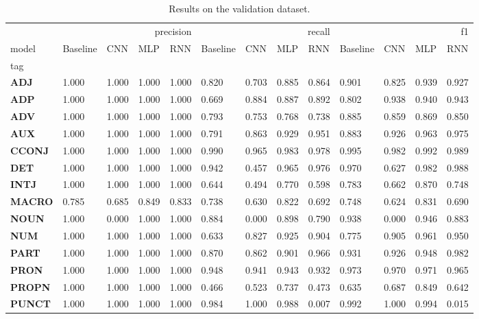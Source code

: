 \begin{table}
\caption{Results on the validation dataset.}
\label{tab::ex_2_valid}
\begin{tabular}{|l||l||l||l||l||l||l||l||l||l||l||l||l|}
\toprule
 & \multicolumn{4}{r}{precision} & \multicolumn{4}{r}{recall} & \multicolumn{4}{r}{f1} \\
model & Baseline & CNN & MLP & RNN & Baseline & CNN & MLP & RNN & Baseline & CNN & MLP & RNN \\
tag &  &  &  &  &  &  &  &  &  &  &  &  \\
\midrule
\textbf{ADJ} & 1.000 & 1.000 & 1.000 & 1.000 & 0.820 & 0.703 & 0.885 & 0.864 & 0.901 & 0.825 & 0.939 & 0.927 \\
\textbf{ADP} & 1.000 & 1.000 & 1.000 & 1.000 & 0.669 & 0.884 & 0.887 & 0.892 & 0.802 & 0.938 & 0.940 & 0.943 \\
\textbf{ADV} & 1.000 & 1.000 & 1.000 & 1.000 & 0.793 & 0.753 & 0.768 & 0.738 & 0.885 & 0.859 & 0.869 & 0.850 \\
\textbf{AUX} & 1.000 & 1.000 & 1.000 & 1.000 & 0.791 & 0.863 & 0.929 & 0.951 & 0.883 & 0.926 & 0.963 & 0.975 \\
\textbf{CCONJ} & 1.000 & 1.000 & 1.000 & 1.000 & 0.990 & 0.965 & 0.983 & 0.978 & 0.995 & 0.982 & 0.992 & 0.989 \\
\textbf{DET} & 1.000 & 1.000 & 1.000 & 1.000 & 0.942 & 0.457 & 0.965 & 0.976 & 0.970 & 0.627 & 0.982 & 0.988 \\
\textbf{INTJ} & 1.000 & 1.000 & 1.000 & 1.000 & 0.644 & 0.494 & 0.770 & 0.598 & 0.783 & 0.662 & 0.870 & 0.748 \\
\textbf{MACRO} & 0.785 & 0.685 & 0.849 & 0.833 & 0.738 & 0.630 & 0.822 & 0.692 & 0.748 & 0.624 & 0.831 & 0.690 \\
\textbf{NOUN} & 1.000 & 0.000 & 1.000 & 1.000 & 0.884 & 0.000 & 0.898 & 0.790 & 0.938 & 0.000 & 0.946 & 0.883 \\
\textbf{NUM} & 1.000 & 1.000 & 1.000 & 1.000 & 0.633 & 0.827 & 0.925 & 0.904 & 0.775 & 0.905 & 0.961 & 0.950 \\
\textbf{PART} & 1.000 & 1.000 & 1.000 & 1.000 & 0.870 & 0.862 & 0.901 & 0.966 & 0.931 & 0.926 & 0.948 & 0.982 \\
\textbf{PRON} & 1.000 & 1.000 & 1.000 & 1.000 & 0.948 & 0.941 & 0.943 & 0.932 & 0.973 & 0.970 & 0.971 & 0.965 \\
\textbf{PROPN} & 1.000 & 1.000 & 1.000 & 1.000 & 0.466 & 0.523 & 0.737 & 0.473 & 0.635 & 0.687 & 0.849 & 0.642 \\
\textbf{PUNCT} & 1.000 & 1.000 & 1.000 & 1.000 & 0.984 & 1.000 & 0.988 & 0.007 & 0.992 & 1.000 & 0.994 & 0.015 \\

\end{tabular}
\end{table}
